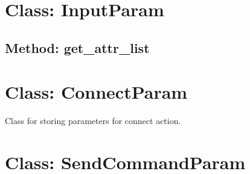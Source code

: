 %
%

\hypertarget{qconnectbase-connection-manager-class-inputparam-21}{%
\section{Class: InputParam}\label{qconnectbase-connection-manager-class-inputparam-21}}

\begin{Shaded}
\begin{Highlighting}[]
\end{Highlighting}
\end{Shaded}

\hypertarget{qconnectbase-connection-manager-method-get_attr_list-22}{%
\subsection{Method: get\_attr\_list}\label{qconnectbase-connection-manager-method-get_attr_list-22}}

\hypertarget{qconnectbase-connection-manager-class-connectparam-23}{%
\section{Class: ConnectParam}\label{qconnectbase-connection-manager-class-connectparam-23}}

\begin{Shaded}
\begin{Highlighting}[]
\end{Highlighting}
\end{Shaded}

Class for storing parameters for connect action.

\hypertarget{qconnectbase-connection-manager-class-sendcommandparam-24}{%
\section{Class: SendCommandParam}\label{qconnectbase-connection-manager-class-sendcommandparam-24}}

\begin{Shaded}
\begin{Highlighting}[]
\end{Highlighting}
\end{Shaded}


